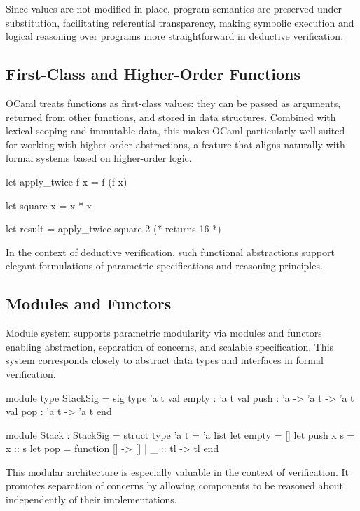 Since values are not modified in place, program semantics are preserved under substitution, facilitating referential transparency, 
making symbolic execution and logical reasoning over programs more straightforward in deductive verification.

\subsection{First-Class and Higher-Order Functions}

OCaml treats functions as first-class values: they can be passed as arguments, returned from other functions, 
and stored in data structures. Combined with lexical scoping and immutable data, this makes OCaml particularly 
well-suited for working with higher-order abstractions, a feature that aligns naturally with formal systems based on 
higher-order logic.

\begin{ocamlenv}
  let apply_twice f x = f (f x)

  let square x = x * x

  let result = apply_twice square 2  (* returns 16 *)
\end{ocamlenv}

In the context of deductive verification, such functional abstractions support elegant formulations of parametric specifications 
and reasoning principles.

\subsection{Modules and Functors}

Module system supports parametric modularity via modules and functors enabling abstraction, separation of concerns, and 
scalable specification. This system corresponds closely to abstract data types and interfaces in formal verification.

\begin{ocamlenv}
  module type StackSig = sig
    type 'a t
    val empty : 'a t
    val push : 'a -> 'a t -> 'a t
    val pop : 'a t -> 'a t
  end

  module Stack : StackSig = struct
    type 'a t = 'a list
    let empty = []
    let push x s = x :: s
    let pop = function [] -> [] | _ :: tl -> tl
  end
\end{ocamlenv}

This modular architecture is especially valuable in the context of verification. It promotes separation of concerns by 
allowing components to be reasoned about independently of their implementations.

